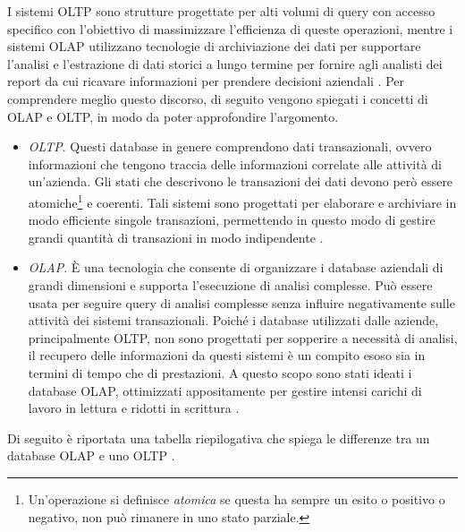 I sistemi OLTP sono strutture progettate per alti volumi di query con accesso specifico con l'obiettivo di massimizzare l'efficienza di queste operazioni, mentre i sistemi OLAP utilizzano tecnologie di archiviazione dei dati per supportare l'analisi e l'estrazione di dati storici a lungo termine per fornire agli analisti dei report da cui ricavare informazioni per prendere decisioni aziendali \cite{ieee_oltp_olap}.
Per comprendere meglio questo discorso, di seguito vengono spiegati i concetti di OLAP e OLTP, in modo da poter approfondire l'argomento.

\begin{itemize}
    \item \textit{OLTP}. Questi database in genere comprendono dati transazionali, ovvero informazioni che tengono traccia delle informazioni correlate alle attività di un'azienda. Gli stati che descrivono le transazioni dei dati devono però essere atomiche\footnote{Un'operazione si definisce \textit{atomica} se questa ha sempre un esito o positivo o negativo, non può rimanere in uno stato parziale.} e coerenti. Tali sistemi sono progettati per elaborare e archiviare in modo efficiente singole transazioni, permettendo in questo modo di gestire grandi quantità di transazioni in modo indipendente \cite{microsoft_oltp}.
    \item \textit{OLAP}. È una tecnologia che consente di organizzare i database aziendali di grandi dimensioni e supporta l'esecuzione di analisi complesse. Può essere usata per seguire query di analisi complesse senza influire negativamente sulle attività dei sistemi transazionali. Poiché i database utilizzati dalle aziende, principalmente OLTP, non sono progettati per sopperire a necessità di analisi, il recupero delle informazioni da questi sistemi è un compito esoso sia in termini di tempo che di prestazioni. A questo scopo sono stati ideati i database OLAP, ottimizzati appositamente per gestire intensi carichi di lavoro in lettura e ridotti in scrittura \cite{microsoft_olap}.
\end{itemize}

Di seguito è riportata una tabella riepilogativa che spiega le differenze tra un database OLAP e uno OLTP \cite{aws_oltp_vs_olap}.

